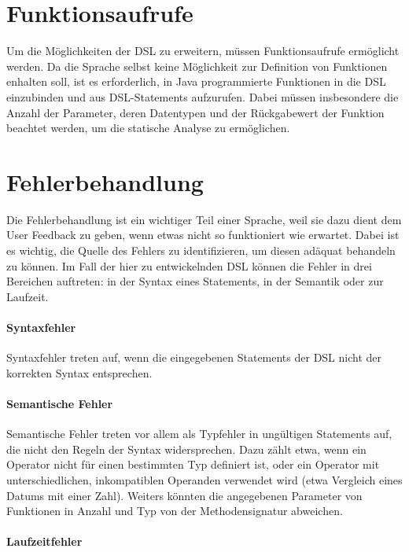 \section{Funktionsaufrufe}
\label{section_analyse_funktionsaufrufe}

Um die Möglichkeiten der DSL zu erweitern, müssen Funktionsaufrufe er\-mög\-licht werden. Da die Sprache selbst keine Möglichkeit zur Definition von Funktionen enhalten soll, ist es erforderlich, in Java programmierte Funktionen in die DSL einzubinden und aus DSL-Statements aufzurufen. Dabei müssen insbesondere die Anzahl der Parameter, deren Datentypen und der Rückgabewert der Funktion beachtet werden, um die statische Analyse zu ermöglichen.


\section{Fehlerbehandlung}
\label{section_analyse_fehlerbehandlung}

Die Fehlerbehandlung ist ein wichtiger Teil einer Sprache, weil sie dazu dient dem User Feedback zu geben, wenn etwas nicht so funktioniert wie erwartet. Dabei ist es wichtig, die Quelle des Fehlers zu identifizieren, um diesen adäquat behandeln zu können. Im Fall der hier zu entwickelnden DSL können die Fehler in drei Bereichen auf\-tre\-ten: in der Syntax eines Statements, in der Semantik oder zur Laufzeit. 

\paragraph*{Syntaxfehler}
Syntaxfehler treten auf, wenn die eingegebenen Statements der DSL nicht der korrekten Syntax entsprechen. 

\paragraph*{Semantische Fehler}

Semantische Fehler treten vor allem als Typfehler in ungültigen Statements auf, die nicht den Regeln der Syntax widersprechen. Dazu zählt etwa, wenn ein Operator nicht für einen bestimmten Typ definiert ist, oder ein Operator mit unterschiedlichen, inkompatiblen Operanden verwendet wird (etwa Vergleich eines Datums mit einer Zahl). Weiters könnten die angegebenen Parameter von Funktionen in Anzahl und Typ von der Methodensignatur abweichen.

\paragraph*{Laufzeitfehler}

